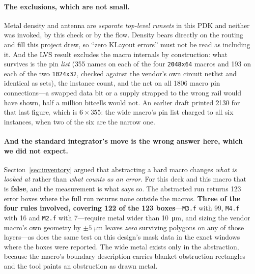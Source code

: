 \documentclass[11pt,a4paper]{article}
\begin{document}
\paragraph{The exclusions, which are not small.}
Metal density and antenna are \emph{separate top-level runsets} in this
PDK and neither was invoked, by this check or by the flow. Density bears
directly on the routing and fill this project drew, so ``zero KLayout
errors'' must not be read as including it. And the LVS result excludes
the macro internals by construction: what survives is the pin
\emph{list} (355 names on each of the four \texttt{2048x64} macros and
193 on each of the two \texttt{1024x32}, checked against the vendor's own
circuit netlist and identical as sets), the instance count, and the net
on all \num{1806} macro pin connections---a swapped data bit or a supply
strapped to the wrong rail would have shown, half a million bitcells
would not. An earlier draft printed \num{2130} for that last figure,
which is $6\times355$: the wide macro's pin list charged to all six
instances, when two of the six are the narrow one.

\paragraph{And the standard integrator's move is the wrong answer here,
which we did not expect.}
Section~\ref{sec:inventory} argued that abstracting a hard macro changes
\emph{what is looked at} rather than \emph{what counts as an error}. For
this deck and this macro that is \textbf{false}, and the measurement is
what says so. The abstracted run returns 123 error boxes where the full
run returns none outside the macros. \textbf{Three of the four rules
involved, covering 122 of the 123 boxes}---\texttt{M3.f} with 99,
\texttt{M4.f} with 16 and \texttt{M2.f} with 7---require metal wider
than \SI{10}{\micro\meter}, and
sizing the vendor macro's own geometry by $\pm\SI{5}{\micro\meter}$
leaves \emph{zero} surviving polygons on any of those layers---as does
the same test on this design's mask data in the exact windows where the
boxes were reported. The wide metal exists only in the abstraction,
because the macro's boundary description carries blanket obstruction
rectangles and the tool paints an obstruction as drawn metal.
\end{document}
